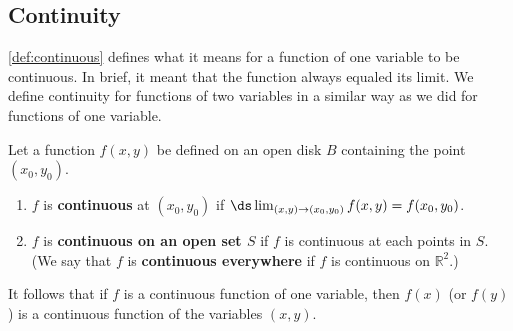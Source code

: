 \subsection{Continuity}

\autoref{def:continuous} defines what it means for a function of one variable to be continuous. In brief, it meant that the function always equaled its limit. We define continuity for functions of two variables in a similar way as we did for functions of one variable.

{Let a function $f(x,y)$ be defined on an open disk $B$ containing the point $(x_0,y_0)$.
\begin{enumerate}
	\item $f$ is \textbf{continuous} at $(x_0,y_0)$ if $\ds\lim_{(x,y)\to(x_0,y_0)} f(x,y) = f(x_0,y_0)$.
	\item	$f$ is \textbf{continuous on an open set $S$} if $f$ is continuous at each points in $S$. (We say that $f$ is \textbf{continuous everywhere} if $f$ is continuous on $\mathbb{R}^2$.)
\end{enumerate}}

It follows that if $f$ is a continuous function of one variable, then $f(x)$ (or $f(y)$) is a continuous function of the variables $(x,y)$.

